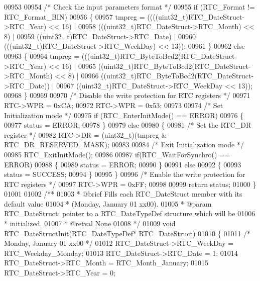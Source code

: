 \begin{DoxyCode}
00953 
00954   \textcolor{comment}{/* Check the input parameters format */}
00955   \textcolor{keywordflow}{if} (RTC\_Format != RTC_Format_BIN)
00956   \{
00957     tmpreg = ((((uint32\_t)RTC\_DateStruct->RTC_Year) << 16) |
00958               (((uint32\_t)RTC\_DateStruct->RTC_Month) << 8) |
00959               ((uint32\_t)RTC\_DateStruct->RTC_Date) |
00960               (((uint32\_t)RTC\_DateStruct->RTC_WeekDay) << 13));
00961   \}
00962   \textcolor{keywordflow}{else}
00963   \{
00964     tmpreg = (((uint32\_t)RTC_ByteToBcd2(RTC\_DateStruct->RTC_Year) << 16) |
00965               ((uint32\_t)RTC_ByteToBcd2(RTC\_DateStruct->RTC_Month) << 8) |
00966               ((uint32\_t)RTC_ByteToBcd2(RTC\_DateStruct->RTC_Date)) |
00967               ((uint32\_t)RTC\_DateStruct->RTC_WeekDay << 13));
00968   \}
00969 
00970   \textcolor{comment}{/* Disable the write protection for RTC registers */}
00971   RTC->WPR = 0xCA;
00972   RTC->WPR = 0x53;
00973 
00974   \textcolor{comment}{/* Set Initialization mode */}
00975   \textcolor{keywordflow}{if} (RTC_EnterInitMode() == ERROR)
00976   \{
00977     status = ERROR;
00978   \}
00979   \textcolor{keywordflow}{else}
00980   \{
00981     \textcolor{comment}{/* Set the RTC\_DR register */}
00982     RTC->DR = (uint32\_t)(tmpreg & RTC_DR_RESERVED_MASK);
00983 
00984     \textcolor{comment}{/* Exit Initialization mode */}
00985     RTC_ExitInitMode();
00986 
00987     \textcolor{keywordflow}{if}(RTC_WaitForSynchro() == ERROR)
00988     \{
00989       status = ERROR;
00990     \}
00991     \textcolor{keywordflow}{else}
00992     \{
00993       status = SUCCESS;
00994     \}
00995   \}
00996   \textcolor{comment}{/* Enable the write protection for RTC registers */}
00997   RTC->WPR = 0xFF;
00998 
00999   \textcolor{keywordflow}{return} status;
01000 \}
01001 
01002 \textcolor{comment}{/**}
01003 \textcolor{comment}{  * @brief  Fills each RTC\_DateStruct member with its default value}
01004 \textcolor{comment}{  *         (Monday, January 01 xx00).}
01005 \textcolor{comment}{  * @param  RTC\_DateStruct: pointer to a RTC\_DateTypeDef structure which will be }
01006 \textcolor{comment}{  *         initialized.}
01007 \textcolor{comment}{  * @retval None}
01008 \textcolor{comment}{  */}
01009 \textcolor{keywordtype}{void} RTC_DateStructInit(RTC\_DateTypeDef* RTC\_DateStruct)
01010 \{
01011   \textcolor{comment}{/* Monday, January 01 xx00 */}
01012   RTC\_DateStruct->RTC_WeekDay = RTC_Weekday_Monday;
01013   RTC\_DateStruct->RTC_Date = 1;
01014   RTC\_DateStruct->RTC_Month = RTC_Month_January;
01015   RTC\_DateStruct->RTC_Year = 0;

\end{DoxyCode}
